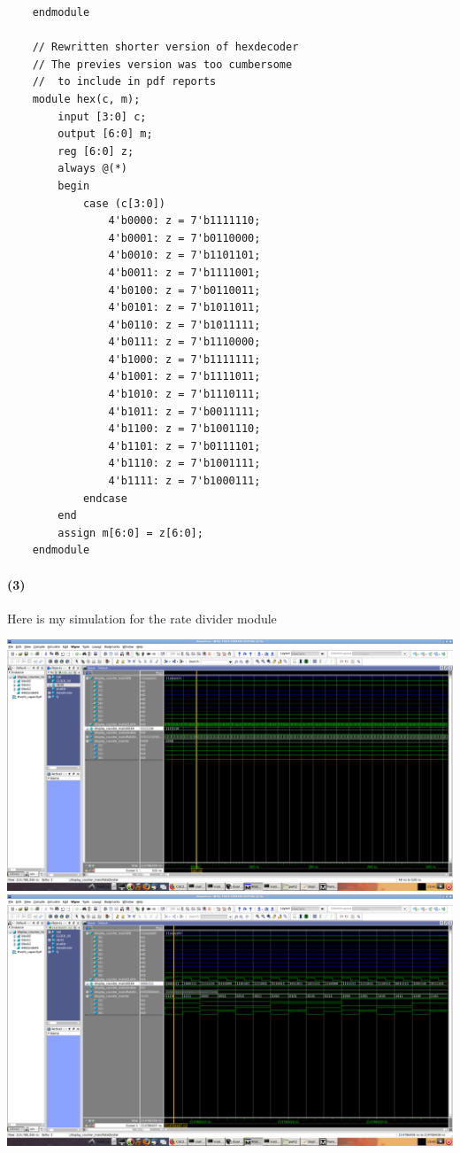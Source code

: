 \documentclass{article}
\begin{document}
\begin{verbatim}
    endmodule
    
    // Rewritten shorter version of hexdecoder
    // The previes version was too cumbersome
    // 	to include in pdf reports
    module hex(c, m);
    	input [3:0] c;
    	output [6:0] m;
    	reg [6:0] z;
    	always @(*)
    	begin
    		case (c[3:0])
    			4'b0000: z = 7'b1111110;
    			4'b0001: z = 7'b0110000;
    			4'b0010: z = 7'b1101101; 
    			4'b0011: z = 7'b1111001;
    			4'b0100: z = 7'b0110011;
    			4'b0101: z = 7'b1011011;  
    			4'b0110: z = 7'b1011111;
    			4'b0111: z = 7'b1110000;
    			4'b1000: z = 7'b1111111;
    			4'b1001: z = 7'b1111011;
    			4'b1010: z = 7'b1110111; 
    			4'b1011: z = 7'b0011111;
    			4'b1100: z = 7'b1001110;
    			4'b1101: z = 7'b0111101;
    			4'b1110: z = 7'b1001111;
    			4'b1111: z = 7'b1000111;
    		endcase
    	end
    	assign m[6:0] = z[6:0];
    endmodule 
\end{verbatim}
\paragraph{(3)} Here is my simulation for the rate divider module
\begin{center}
    \includegraphics[scale=0.25]{q2_full_freq.png}
    \includegraphics[scale=0.25]{q2_00_slow.png}
\end{center}
\end{document}
